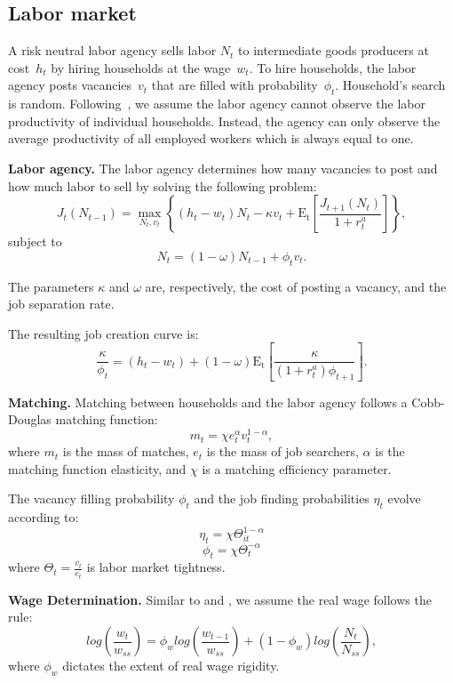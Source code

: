\documentclass[\econtexRoot/HAFiscal]{subfiles}
\begin{document}
\subsection{Labor market}

A risk neutral labor agency sells labor $N_{t}$ to intermediate goods producers at cost~$h_{t}$ by hiring households at the wage~$w_t$. To hire households, the labor agency posts vacancies~$v_{t}$ that are filled with probability~$\phi_{t}$. Household's search is random. Following~\cite{Bardoczy2022}, we assume the labor agency cannot observe the labor productivity of individual households. Instead, the agency can only observe the average productivity of all employed workers which is always equal to one. 

\textbf{Labor agency.} The labor agency determines how many vacancies to post and how much labor to sell by solving the following problem: 
$$J_{t}(N_{t-1})  = \max_{N_{t},v_{t}} \left\{( h_{t} - w_{t}) N_{t}- \kappa v_{t} + \mathrm{E_{t}}\left[ \frac{J_{t+1}(N_{t})}{1 + r^{a}_{t}}\right]\right\},$$
subject to
$$ N_{t} = (1-\omega)N_{t-1} + \phi_{t} v_{t}.$$ 

The parameters $\kappa$ and $\omega$ are, respectively, the cost of posting a vacancy, and the job separation rate. 

The resulting job creation curve is:
$$ \frac{\kappa}{\phi_{t}}  = (h_{t} - w_{t})+  (1-\omega)\mathrm{E_{t}}\left[   \frac{\kappa}{(1+r^{a}_{t}) \phi_{t+1}} \right].$$

\textbf{Matching.} Matching between households and the labor agency follows a Cobb-Douglas matching function:
$$m_{t} = \chi e_{t}^{\alpha} v_{t}^{1-\alpha},$$ 
where $m_{t}$ is the mass of matches, $e_{t}$ is the mass of job searchers, $\alpha$ is the matching function elasticity, and $\chi$ is a matching efficiency parameter.

The vacancy filling probability $\phi_{t}$ and the job finding probabilities $\eta_{t}$ evolve according to:
$$\eta_{t} = \chi \Theta_{it}^{1-\alpha} $$
$$ \phi_{t} = \chi \Theta_{t}^{-\alpha} $$ 
where $\Theta_{t} = \frac{v_{t}}{e_{t}}$ is labor market tightness.

\textbf{Wage Determination.} Similar to \cite{Gornemann2021} and \cite{Blanchard2010}, we assume the real wage follows the rule:
$$log\left(\frac{w_{t}}{w_{ss}}\right)  = \phi_w log\left( \frac{ w_{t-1}}{ w_{ss}} \right) +   (1 - \phi_w) log\left( \frac{N_{t}}{N_{ss}}\right),$$
where $\phi_w$ dictates the extent of real wage rigidity. 
\end{document}
